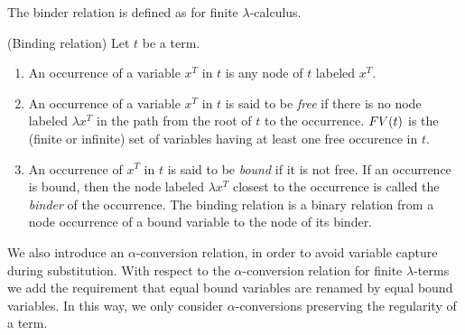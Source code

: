 
The binder relation is defined as for finite $\lambda$-calculus.

\begin{definition}(Binding relation)
\label{definition-binder-relation}
Let $t$ be a term.
\begin{enumerate}
\item
An occurrence of a variable $x^T$ in $t$ is any node of $t$ labeled $x^T$.
\item
An occurrence of a variable $x^T$ in $t$ is said to be \emph{free} if there is no node labeled $\lambda x^T$
in the path from the root of $t$ to the occurrence. 
${{\relax FV}}(t)$ is the (finite or infinite) set of variables having at least one free occurence in $t$.
\item
An occurrence of $x^T$ in $t$ is said to be \emph{bound} if it is not free. If an occurrence is bound, then
the node labeled $\lambda x^T$ closest to the occurrence is called the \emph{binder} of
the occurrence.
The binding relation is a binary relation from a node occurrence of a bound variable to the node of its binder. 
\end{enumerate}
\end{definition}

We also introduce an $\alpha$-conversion relation, in order to avoid variable capture
during substitution. With respect to the $\alpha$-conversion
relation for finite $\lambda$-terms 
we add the requirement that equal bound variables are renamed by equal bound variables. 
In this way, we only consider $\alpha$-conversions 
preserving the regularity of a term.


